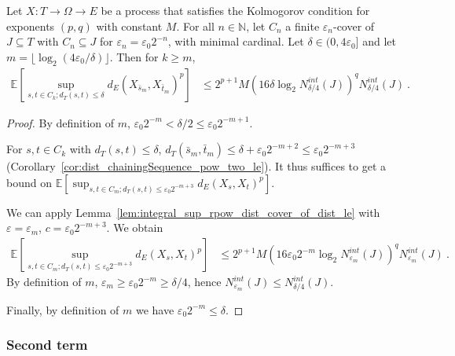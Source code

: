 \begin{lemma}\label{lem:integral_sup_rpow_dist_cover_rescale}
  \leanok
Let $X : T \to \Omega \to E$ be a process that satisfies the Kolmogorov condition for exponents $(p,q)$ with constant $M$.
For all $n \in \mathbb{N}$, let $C_n$ a finite $\varepsilon_n$-cover of $J \subseteq T$ with $C_n \subseteq J$ for $\varepsilon_n = \varepsilon_0 2^{-n}$, with minimal cardinal.
Let $\delta \in (0, 4 \varepsilon_0]$ and let $m = \lfloor \log_2(4\varepsilon_0/\delta) \rfloor$.
Then for $k \ge m$,
\begin{align*}
  \mathbb{E} \left[ \sup_{s, t \in C_k; d_T(s, t) \le \delta} d_E(X_{\bar{s}_m}, X_{\bar{t}_m})^p \right]
  &\le 2^{p+1} M \left(16 \delta \log_2 N^{int}_{\delta/4}(J) \right)^q  N^{int}_{\delta/4}(J)
  \: .
\end{align*}
\end{lemma}

\begin{proof}
By definition of $m$, $\varepsilon_0 2^{-m} < \delta/2 \le \varepsilon_0 2^{-m+1}$.

For $s, t \in C_k$ with $d_T(s, t) \le \delta$, $d_T(\bar{s}_m, \bar{t}_m) \le \delta + \varepsilon_0 2^{-m+2} \le \varepsilon_0 2^{-m+3}$ (Corollary~\ref{cor:dist_chainingSequence_pow_two_le}).
It thus suffices to get a bound on $\mathbb{E} \left[ \sup_{s, t \in C_m; d_T(s, t) \le \varepsilon_0 2^{-m+3}} d_E(X_s, X_t)^p \right]$.

We can apply Lemma~\ref{lem:integral_sup_rpow_dist_cover_of_dist_le} with $\varepsilon = \varepsilon_m$, $c = \varepsilon_0 2^{-m+3}$. We obtain
\begin{align*}
  \mathbb{E} \left[ \sup_{s, t \in C_m; d_T(s, t) \le \varepsilon_0 2^{-m+3}} d_E(X_s, X_t)^p \right]
  &\le 2^{p+1} M \left(16 \varepsilon_0 2^{-m} \log_2 N^{int}_{\varepsilon_m}(J) \right)^q  N^{int}_{\varepsilon_m}(J)
  \: .
\end{align*}
By definition of $m$, $\varepsilon_m \ge \varepsilon_0 2^{-m} \ge \delta/4$,
hence $N^{int}_{\varepsilon_m}(J) \le N^{int}_{\delta / 4}(J)$.

Finally, by definition of $m$ we have $\varepsilon_0 2^{-m} \le \delta$.
\end{proof}



\subsubsection{Second term}


